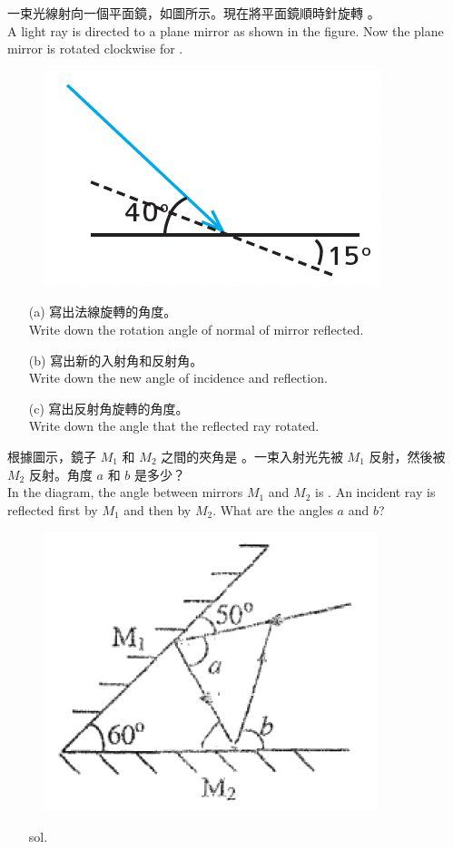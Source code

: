 \documentclass[beamer=true]{standalone}
\begin{document}
\begin{eg}
    一束光線射向一個平面鏡，如圖所示。現在將平面鏡順時針旋轉 。\\A light ray is directed to a plane mirror as shown in the figure. Now the plane mirror is rotated clockwise for .
    \begin{figure}[h]
        \centering
        \includegraphics[width=0.3\linewidth]{assets/dwdop12age.png}
    \end{figure}
    \begin{itemize}
        \item [(a)] 寫出法線旋轉的角度。\\Write down the rotation angle of normal of mirror reflected.
    \end{itemize}
    
\end{eg}
\begin{eg}
    \begin{itemize}
        \item [(b)] 寫出新的入射角和反射角。\\Write down the new angle of incidence and reflection.\vspace{2cm}
        \item [(c)] 寫出反射角旋轉的角度。\\Write down the angle that the reflected ray rotated.
    \end{itemize}
\end{eg}
\begin{eg}
根據圖示，鏡子 $M_1$ 和 $M_2$ 之間的夾角是 。一束入射光先被 $M_1$ 反射，然後被 $M_2$ 反射。角度 $a$ 和 $b$ 是多少？\\In the diagram, the angle between mirrors $M_1$ and $M_2$ is . An incident ray is reflected first by $M_1$ and then by $M_2$. What are the angles $a$ and $b$?
    \begin{figure}
        \centering
        \includegraphics[width=0.4\linewidth]{assets/qdijiowqdiqwjoidjwq.png}
        
        
    \end{figure}
\end{eg}
\begin{eg}
    \begin{itemize}
        \item [sol.]
    \end{itemize}
\end{eg}
\end{document}
